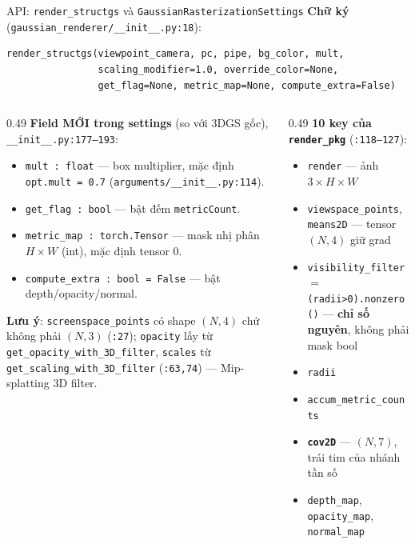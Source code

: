 \begin{frame}[fragile]{API: \texttt{render\_structgs} và \texttt{GaussianRasterizationSettings}}
\scriptsize
\textbf{Chữ ký} (\texttt{gaussian\_renderer/\_\_init\_\_.py:18}):
\begin{verbatim}
render_structgs(viewpoint_camera, pc, pipe, bg_color, mult,
                scaling_modifier=1.0, override_color=None,
                get_flag=None, metric_map=None, compute_extra=False)
\end{verbatim}
\begin{columns}[T]
\begin{column}{0.49\textwidth}
\textbf{Field MỚI trong settings} (so với 3DGS gốc), \texttt{\_\_init\_\_.py:177--193}:
\begin{itemize}\itemsep1pt
    \item \texttt{mult : float} --- box multiplier, mặc định \texttt{opt.mult = 0.7} (\texttt{arguments/\_\_init\_\_.py:114}).
    \item \texttt{get\_flag : bool} --- bật đếm \texttt{metricCount}.
    \item \texttt{metric\_map : torch.Tensor} --- mask nhị phân $H\!\times\!W$ (int), mặc định tensor 0.
    \item \texttt{compute\_extra : bool = False} --- bật depth/opacity/normal.
\end{itemize}
\textbf{Lưu ý}: \texttt{screenspace\_points} có shape $(N,4)$ chứ không phải $(N,3)$ (\texttt{:27}); \texttt{opacity} lấy từ \texttt{get\_opacity\_with\_3D\_filter}, \texttt{scales} từ \texttt{get\_scaling\_with\_3D\_filter} (\texttt{:63,74}) --- Mip-splatting 3D filter.
\end{column}
\begin{column}{0.49\textwidth}
\textbf{10 key của \texttt{render\_pkg}} (\texttt{:118--127}):
\begin{itemize}\itemsep0pt
    \item \texttt{render} --- ảnh $3\times H\times W$
    \item \texttt{viewspace\_points}, \texttt{means2D} --- tensor $(N,4)$ giữ grad
    \item \texttt{visibility\_filter} $=$ \texttt{(radii>0).nonzero()} --- \textbf{chỉ số nguyên}, không phải mask bool
    \item \texttt{radii}
    \item \texttt{accum\_metric\_counts}
    \item \texttt{\textbf{cov2D}} --- $(N,7)$, trái tim của nhánh tần số
    \item \texttt{depth\_map}, \texttt{opacity\_map}, \texttt{normal\_map}
\end{itemize}
\end{column}
\end{columns}
\end{frame}

